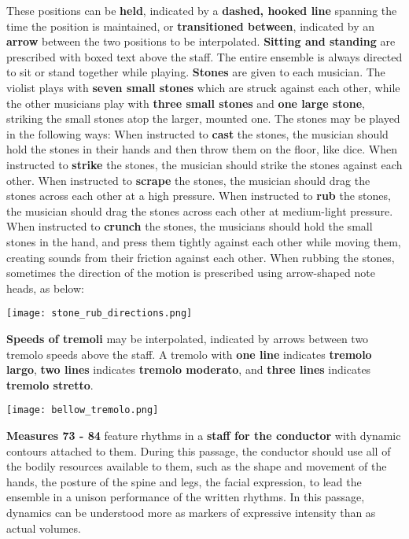 \documentclass[12pt]{article}
\newcommand*\circled[1]{\tikz[baseline=(char.base)]{
            \node[shape=circle,draw,inner sep=1pt] (char) {#1};}}
\begin{document}
\begingroup
These positions can be \textbf{held}, indicated by a \textbf{dashed, hooked line} spanning the time the position is maintained, or \textbf{transitioned between}, indicated by an \textbf{arrow} between the two positions to be interpolated.
\textbf{\circled{6} Sitting and standing} are prescribed with boxed text above the staff. The entire ensemble is always directed to sit or stand together while playing. 
\textbf{\circled{7} Stones} are given to each musician. The violist plays with \textbf{seven small stones} which are struck against each other, while the other musicians play with \textbf{three small stones} and \textbf{one large stone}, striking the small stones atop the larger, mounted one. The stones may be played in the following ways: When instructed to \textbf{cast} the stones, the musician should hold the stones in their hands and then throw them on the floor, like dice. When instructed to \textbf{strike} the stones, the musician should strike the stones against each other. When instructed to \textbf{scrape} the stones, the musician should drag the stones across each other at a high pressure. When instructed to \textbf{rub} the stones, the musician should drag the stones across each other at medium-light pressure. When instructed to \textbf{crunch} the stones, the musicians should hold the small stones in the hand, and press them tightly against each other while moving them, creating sounds from their friction against each other. When rubbing the stones, sometimes the direction of the motion is prescribed using arrow-shaped note heads, as below: \\
\begin{center}
\texttt{[image: stone\_rub\_directions.png]}
\end{center}
\textbf{\circled{8} Speeds of tremoli} may be interpolated, indicated by arrows between two tremolo speeds above the staff. A tremolo with \textbf{one line} indicates \textbf{tremolo largo}, \textbf{two lines} indicates \textbf{tremolo moderato}, and \textbf{three lines} indicates \textbf{tremolo stretto}.
\begin{center}
\texttt{[image: bellow\_tremolo.png]}
\end{center}
\textbf{\circled{9} Measures 73 - 84} feature rhythms in a \textbf{staff for the conductor} with dynamic contours attached to them. During this passage, the conductor should use all of the bodily resources available to them, such as the shape and movement of the hands, the posture of the spine and legs, the facial expression, to lead the ensemble in a unison performance of the written rhythms. In this passage, dynamics can be understood more as markers of expressive intensity than as actual volumes. 
\endgroup 
\end{document}
